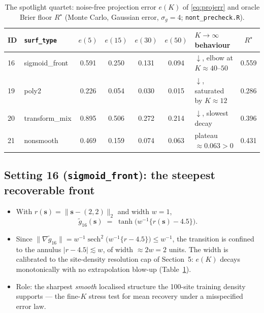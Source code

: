 \documentclass[11pt]{article}
\newcommand{\bs}{\boldsymbol{s}}
\begin{document}
\begin{table}[ht]
\centering\small
\caption{The spotlight quartet: noise-free projection error $e(K)$ of
\eqref{eq:projerr} and oracle Brier floor $R^\star$ (Monte Carlo, Gaussian
error, $\sigma_g = 4$; \texttt{nont\_precheck.R}).}
\label{tab:spotlight}
\begin{tabular}{llccccl c}
\toprule
ID & \texttt{surf\_type} & $e(5)$ & $e(15)$ & $e(30)$ & $e(50)$ &
$K \to \infty$ behaviour & $R^\star$ \\
\midrule
16 & sigmoid\_front & 0.591 & 0.250 & 0.131 & 0.094 & $\downarrow$, elbow at $K \approx 40$--$50$ & 0.559 \\
19 & poly2          & 0.226 & 0.054 & 0.030 & 0.015 & $\downarrow$, saturated by $K \approx 12$   & 0.286 \\
20 & transform\_mix & 0.895 & 0.506 & 0.272 & 0.214 & $\downarrow$, slowest decay                & 0.396 \\
21 & nonsmooth      & 0.469 & 0.159 & 0.074 & 0.063 & plateau $\approx 0.063 > 0$                & 0.431 \\
\bottomrule
\end{tabular}
\end{table}

\subsection*{Setting 16 (\texttt{sigmoid\_front}): the steepest recoverable
front}

\begin{itemize}
\item With $r(\bs) = \lVert \bs - (2,2) \rVert_2$ and width $w = 1$,
\begin{equation}
\tilde g_{16}(\bs) \;=\; \tanh\!\big(w^{-1}\{r(\bs) - 4.5\}\big).
\label{eq:g16}
\end{equation}
\item Since $\lVert \nabla \tilde g_{16} \rVert
= w^{-1}\operatorname{sech}^2\!\big(w^{-1}\{r - 4.5\}\big) \le w^{-1}$, the
transition is confined to the annulus $|r - 4.5| \lesssim w$, of width
$\approx 2w = 2$ units. The width is calibrated to the site-density
resolution cap of Section~5: $e(K)$ decays monotonically with no
extrapolation blow-up (Table~\ref{tab:spotlight}).
\item Role: the sharpest \emph{smooth} localised structure the 100-site
training density supports --- the fine-$K$ stress test for mean recovery
under a misspecified error law.
\end{itemize}
\end{document}
